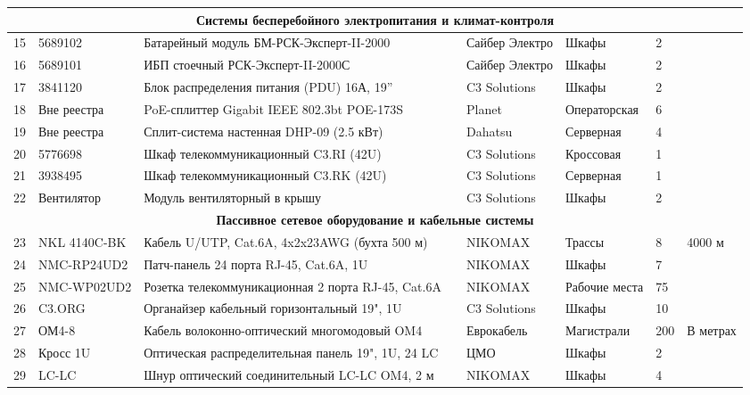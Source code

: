 \documentclass{bmstu}
\begin{document}
\begin{appendices}
\begin{landscape}
\begin{small}
\begin{longtable}{|p{0.8cm}|p{2.5cm}|p{6.2cm}|p{2.3cm}|p{2.3cm}|p{3.2cm}|p{1.2cm}|p{3.0cm}|}
\multicolumn{8}{|c|}{\textbf{Системы бесперебойного электропитания и климат-контроля}} \\ \hline
15 & 5689102 & Батарейный модуль БМ-РСК-Эксперт-II-2000 & & Сайбер Электро & Шкафы & 2 & \\ \hline
16 & 5689101 & ИБП стоечный РСК-Эксперт-II-2000С & & Сайбер Электро & Шкафы & 2 & \\ \hline
17 & 3841120 & Блок распределения питания (PDU) 16А, 19'' & & C3 Solutions & Шкафы & 2 & \\ \hline
18 & Вне реестра & PoE-сплиттер Gigabit IEEE 802.3bt POE-173S & & Planet & Операторская & 6 & \\ \hline
19 & Вне реестра & Сплит-система настенная DHP-09 (2.5 кВт) & & Dahatsu & Серверная & 4 & \\ \hline
20 & 5776698 & Шкаф телекоммуникационный C3.RI (42U) & & C3 Solutions & Кроссовая & 1 & \\ \hline
21 & 3938495 & Шкаф телекоммуникационный C3.RK (42U) & & C3 Solutions & Серверная & 1 & \\ \hline
22 & Вентилятор & Модуль вентиляторный в крышу & & C3 Solutions & Шкафы & 2 & \\ \hline

\multicolumn{8}{|c|}{\textbf{Пассивное сетевое оборудование и кабельные системы}} \\ \hline
23 & NKL 4140C-BK & Кабель U/UTP, Cat.6A, 4x2x23AWG (бухта 500 м) & & NIKOMAX & Трассы & 8 & 4000 м \\ \hline
24 & NMC-RP24UD2 & Патч-панель 24 порта RJ-45, Cat.6A, 1U & & NIKOMAX & Шкафы & 7 & \\ \hline
25 & NMC-WP02UD2 & Розетка телекоммуникационная 2 порта RJ-45, Cat.6A & & NIKOMAX & Рабочие места & 75 & \\ \hline
26 & C3.ORG & Органайзер кабельный горизонтальный 19", 1U & & C3 Solutions & Шкафы & 10 & \\ \hline
27 & ОМ4-8 & Кабель волоконно-оптический многомодовый OM4 & & Еврокабель & Магистрали & 200 & В метрах \\ \hline
28 & Кросс 1U & Оптическая распределительная панель 19", 1U, 24 LC & & ЦМО & Шкафы & 2 & \\ \hline
29 & LC-LC & Шнур оптический соединительный LC-LC OM4, 2 м & & NIKOMAX & Шкафы & 4 & \\ \hline

\end{longtable}
\end{small}
\end{landscape}


\end{appendices}
\end{document}
